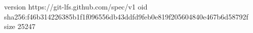 version https://git-lfs.github.com/spec/v1
oid sha256:f46b314226385b1f1f096556db43ddfd9feb0e819f205604840e467b6d58792f
size 25247
